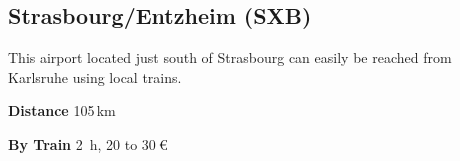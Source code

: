 \begin{multicols}{2}
\subsection{Strasbourg/Entzheim (SXB)}

This airport located just south of Strasbourg can easily be reached from Karlsruhe
using local trains.

\begin{labeling}{\hspace*{10ex}}
  \item[\bf Distance] 105\,km
  \item[\bf By Train] \SI{2}{\hour}, 20 to $\SI{30}{\euro}$
\end{labeling}

\end{multicols}

\newpage

